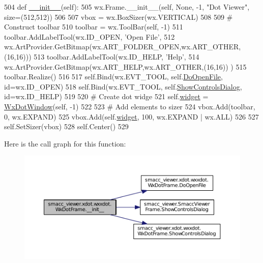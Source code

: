\begin{DoxyCode}
504   \textcolor{keyword}{def }\hyperlink{classsmacc__viewer_1_1xdot_1_1wxxdot_1_1WxDotFrame_a03ac561b2408b4dd264d2a3201c9ce4c}{\_\_init\_\_}(self):
505     wx.Frame.\_\_init\_\_(self, \textcolor{keywordtype}{None}, -1, \textcolor{stringliteral}{"Dot Viewer"}, size=(512,512))
506 
507     vbox = wx.BoxSizer(wx.VERTICAL)
508 
509     \textcolor{comment}{# Construct toolbar}
510     toolbar = wx.ToolBar(self, -1)
511     toolbar.AddLabelTool(wx.ID\_OPEN, \textcolor{stringliteral}{'Open File'},
512         wx.ArtProvider.GetBitmap(wx.ART\_FOLDER\_OPEN,wx.ART\_OTHER,(16,16)))
513     toolbar.AddLabelTool(wx.ID\_HELP, \textcolor{stringliteral}{'Help'},
514         wx.ArtProvider.GetBitmap(wx.ART\_HELP,wx.ART\_OTHER,(16,16)) )
515     toolbar.Realize()
516 
517     self.Bind(wx.EVT\_TOOL, self.\hyperlink{classsmacc__viewer_1_1xdot_1_1wxxdot_1_1WxDotFrame_a133223742fb695676ea62ba29a985dbb}{DoOpenFile}, id=wx.ID\_OPEN)
518     self.Bind(wx.EVT\_TOOL, self.\hyperlink{classsmacc__viewer_1_1xdot_1_1wxxdot_1_1WxDotFrame_a5116d653e19a10b16c0efed6aae13874}{ShowControlsDialog}, id=wx.ID\_HELP)
519 
520     \textcolor{comment}{# Create dot widge}
521     self.\hyperlink{classsmacc__viewer_1_1xdot_1_1wxxdot_1_1WxDotFrame_ab72815878b25f1f3c85c5bf6cc3eaaf9}{widget} = \hyperlink{classsmacc__viewer_1_1xdot_1_1wxxdot_1_1WxDotWindow}{WxDotWindow}(self, -1)
522 
523     \textcolor{comment}{# Add elements to sizer}
524     vbox.Add(toolbar, 0, wx.EXPAND)
525     vbox.Add(self.\hyperlink{classsmacc__viewer_1_1xdot_1_1wxxdot_1_1WxDotFrame_ab72815878b25f1f3c85c5bf6cc3eaaf9}{widget}, 100, wx.EXPAND | wx.ALL)
526 
527     self.SetSizer(vbox)
528     self.Center()
529 
\end{DoxyCode}


Here is the call graph for this function\+:
\nopagebreak
\begin{figure}[H]
\begin{center}
\leavevmode
\includegraphics[width=350pt]{classsmacc__viewer_1_1xdot_1_1wxxdot_1_1WxDotFrame_a03ac561b2408b4dd264d2a3201c9ce4c_cgraph}
\end{center}
\end{figure}




